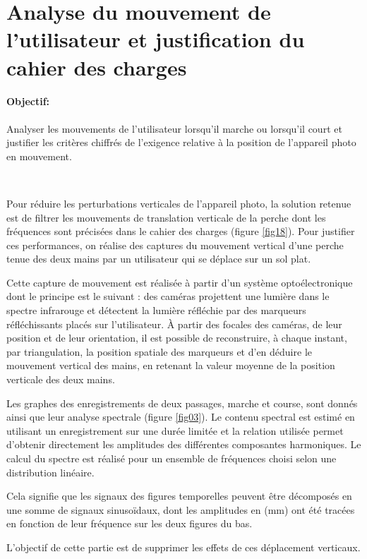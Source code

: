 \newpage

\section{Analyse du mouvement de l'utilisateur et justification du cahier
des charges}

\paragraph{Objectif:} Analyser les mouvements de l'utilisateur lorsqu'il marche ou lorsqu'il court et justifier les critères chiffrés de l'exigence relative à la position de l'appareil photo en mouvement.

~\

Pour réduire les perturbations verticales de l'appareil photo, la solution retenue est de filtrer les mouvements de translation verticale de la perche dont les fréquences sont précisées dans le cahier des charges (figure \ref{fig18}). Pour justifier ces performances, on réalise des captures du mouvement vertical d'une perche tenue des deux mains
par un utilisateur qui se déplace sur un sol plat.

Cette capture de mouvement est réalisée à partir d'un système optoélectronique dont le principe est le suivant : des caméras projettent une lumière dans le spectre infrarouge et détectent la lumière réfléchie par des marqueurs réfléchissants placés sur l'utilisateur. À partir des focales des caméras, de leur position et de leur orientation, il est possible de reconstruire, à chaque instant, par triangulation, la position spatiale des marqueurs et d'en déduire le mouvement vertical des mains, en retenant la valeur moyenne de la position verticale des deux mains.

Les graphes des enregistrements de deux passages, marche et course, sont donnés ainsi que leur analyse spectrale (figure \ref{fig03}). Le contenu spectral est estimé en utilisant un enregistrement sur une durée limitée et la relation utilisée permet d'obtenir directement les amplitudes des différentes composantes harmoniques. Le calcul du spectre est
réalisé pour un ensemble de fréquences choisi selon une distribution linéaire.

Cela signifie que les signaux des figures temporelles peuvent être décomposés en une somme de signaux sinusoïdaux, dont les amplitudes en (mm) ont été tracées en fonction de leur fréquence sur les deux figures du bas.

L'objectif de cette partie est de supprimer les effets de ces déplacement verticaux.

